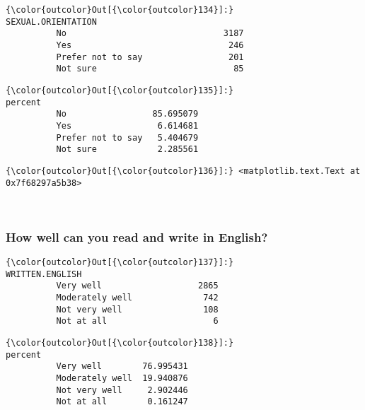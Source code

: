 \documentclass[11pt]{article}
\begin{document}
            \begin{Verbatim}[commandchars=\\\{\}]
{\color{outcolor}Out[{\color{outcolor}134}]:}                    SEXUAL.ORIENTATION
          No                               3187
          Yes                               246
          Prefer not to say                 201
          Not sure                           85
\end{Verbatim}
        

            \begin{Verbatim}[commandchars=\\\{\}]
{\color{outcolor}Out[{\color{outcolor}135}]:}                      percent
          No                 85.695079
          Yes                 6.614681
          Prefer not to say   5.404679
          Not sure            2.285561
\end{Verbatim}
        

            \begin{Verbatim}[commandchars=\\\{\}]
{\color{outcolor}Out[{\color{outcolor}136}]:} <matplotlib.text.Text at 0x7f68297a5b38>
\end{Verbatim}
        
    \begin{center}
    \end{center}
    { \hspace*{\fill} \\}
    
    \subsubsection{How well can you read and write in
English?}\label{how-well-can-you-read-and-write-in-english}


            \begin{Verbatim}[commandchars=\\\{\}]
{\color{outcolor}Out[{\color{outcolor}137}]:}                  WRITTEN.ENGLISH
          Very well                   2865
          Moderately well              742
          Not very well                108
          Not at all                     6
\end{Verbatim}
        

            \begin{Verbatim}[commandchars=\\\{\}]
{\color{outcolor}Out[{\color{outcolor}138}]:}                    percent
          Very well        76.995431
          Moderately well  19.940876
          Not very well     2.902446
          Not at all        0.161247
\end{Verbatim}
        
\end{document}
